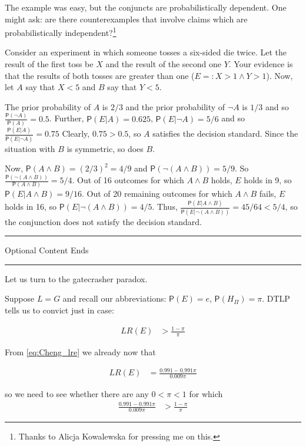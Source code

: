 \documentclass[10pt,dvipsnames,enabledeprecatedfontcommands]{scrartcl}
\newcommand{\n}{\neg}
\newcommand{\et}{\wedge}
\newcommand{\pr}[1]{\mathsf{P}(#1)}
\newcommand{\intermezzob}{\nopagebreak 
	\begin{minipage}[c]{13cm}
	\begin{center}\rule{10cm}{0.4pt}

	\tiny{\sc Optional Content Ends}
	
	\vspace{-1mm}
	
	\rule{10cm}{0.4pt}\end{center}
	\end{minipage}
	}
\begin{document}
The example was easy, but the conjuncts are probabilistically dependent.
One might ask: are there counterexamples that involve claims which are
probabilistically
independent?\footnote{Thanks to Alicja Kowalewska for pressing me on this.}

Consider an experiment in which someone tosses a six-sided die twice.
Let the result of the first toss be \(X\) and the result of the second
one \(Y\). Your evidence is that the results of both tosses are greater
than one (\(E=: X>1 \et Y>1\)). Now, let \(A\) say that \(X<5\) and
\(B\) say that \(Y<5\).

The prior probability of \(A\) is \(2/3\) and the prior probability of
\(\n A\) is \(1/3\) and so \(\frac{\pr{\n A}}{\pr{A}}=0.5\). Further,
\(\pr{E\vert A}=0.625\), \(\pr{E\vert \n A}= 5/6\) and so
\(\frac{\pr{E\vert A}}{\pr{E\vert \n A}}=0.75\) Clearly, \(0.75>0.5\),
so \(A\) satisfies the decision standard. Since the situation with \(B\)
is symmetric, so does \(B\).

Now, \(\pr{A\et B}=(2/3)^2=4/9\) and \(\pr{\n (A\et B)}=5/9\). So
\(\frac{\pr{\n(A\et B)}}{\pr{A\et B}}=5/4\). Out of 16 outcomes for
which \(A\et B\) holds, \(E\) holds in 9, so
\(\pr{E\vert A\et B}=9/16\). Out of 20 remaining outcomes for which
\(A\et B\) fails, \(E\) holds in 16, so \(\pr{E\vert \n (A\et B)}=4/5\).
Thus, \(\frac{\pr{E\vert A\et B}}{\pr{E\vert \n (A\et B)}}=45/64 <5/4\),
so the conjunction does not satisfy the decision standard.

\intermezzob

Let us turn to the gatecrasher paradox.

Suppose \(L=G\) and recall our abbreviations: \(\pr{E}=e\),
\(\pr{H_\Pi}=\pi\). DTLP tells us to convict just in case:

\begin{align*}
 LR(E) &> \frac{1-\pi}{\pi}
 \end{align*}

\noindent From \eqref{eq:Cheng_lre} we already now that

\begin{align*}
 LR(E) & = \frac{0.991-0.991\pi}{0.009\pi}
 \end{align*}

\noindent so we need to see whether there are any \(0<\pi<1\) for
which\\

\begin{align*}
  \frac{0.991-0.991\pi}{0.009\pi} &> \frac{1-\pi}{\pi}
 \end{align*}
\end{document}
